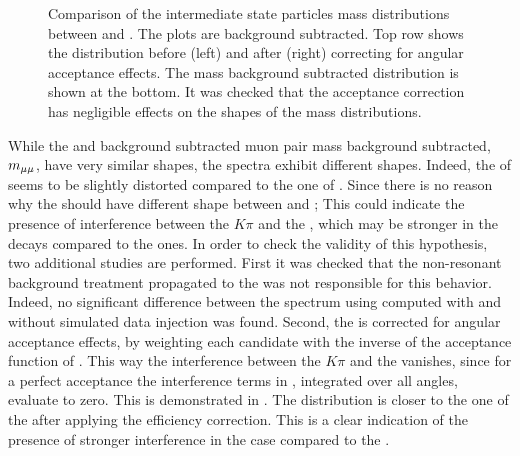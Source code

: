 \begin{figure}[!t]
  \centering
  \begin{subfigure}{0.5\textwidth}
    \raggedright
    \scalebox{0.56}{}
    \caption{}
    \label{mkpiPlot_raw}
  \end{subfigure}%
  \hfill%
  \begin{subfigure}{0.5\textwidth}
    \raggedleft
    \scalebox{0.56}{}
    \caption{}
    \label{mkpiPlot_eff}
  \end{subfigure}
  \begin{subfigure}{0.5\textwidth}
    \raggedright
    \scalebox{0.56}{}
    \caption{}
    \label{jpsiPlot}
  \end{subfigure}
\caption{Comparison of the intermediate state particles mass distributions between \Bs and \Bd.
         The plots are background subtracted. Top row shows the \mkpi distribution before (left)
         and after (right) correcting for angular acceptance effects. The \jpsi mass background subtracted
         distribution is shown at the bottom. It was checked that the acceptance correction has negligible
         effects on the shapes of the \jpsi mass distributions.}
\end{figure}

While the \Bs and \Bd background subtracted muon pair mass background subtracted, $m_{\mu\mu}$, have very similar shapes, the \mkpi spectra exhibit different shapes.
Indeed, the \Bs \mkpi \sPlot of  seems to be slightly distorted compared to the one of \Bd \mkpi.
Since there is no \aprior reason why the \Kstarz \pwave
should have different shape between \BsJpsiKst and \BdJpsiKst; This could indicate the presence of interference between
the $K\pi$ \swave and the \Kstarz, which may be stronger in the \Bs decays compared to the \Bd ones. In order
to check the validity of this hypothesis, two additional studies are performed. First it was checked that the non-resonant
background treatment propagated to the \sWeights was not responsible for this behavior. Indeed, no significant difference
between the \Bs \mkpi spectrum using \sWeights computed with and without simulated data injection was found. Second, the \mkpi
is corrected for angular acceptance effects, by weighting each candidate with the inverse of the acceptance function of .
This way the interference between the $K\pi$ \swave and the \Kstarz \pwave vanishes, since
for a perfect acceptance the interference terms in , integrated over all angles, evaluate to zero.
This is demonstrated in . The \Bs \mkpi distribution is closer to the one of the \Bd after applying
the efficiency correction. This is a clear indication of the presence of stronger interference in the \Bs case compared to the \Bd.

